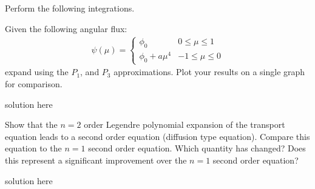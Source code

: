 \documentclass[12pts]{exam}
\begin{document}
\begin{questions}

        \question[20] Perform the following integrations.

        \question[40] Given the following angular flux:
        \begin{align}
                        \psi(\mu) = 
                \begin{cases}
                        \phi_0 & 0\le \mu \le 1\\
                        \phi_0  + a \mu^4 & -1\le \mu \le 0
                \end{cases}
        \end{align}
        expand using the $P_1$, and $P_3$ approximations. Plot your results on a single graph for
comparison.
        \begin{solution}
                solution here
        \end{solution}

        \question[20] Show that the $n=2$ order Legendre polynomial expansion of 
        the transport equation leads to a second order equation (diffusion type 
        equation). Compare this equation to the $n=1$ second order equation. 
        Which quantity has changed? Does this represent a significant 
        improvement over the $n=1$ second order equation?

        \begin{solution}
                solution here
        \end{solution}



\end{questions}
\end{document}
